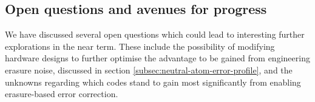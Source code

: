 \documentclass{article}
\begin{document}




    \subsection{Open questions and avenues for progress}

    We have discussed several open questions which could lead to interesting further explorations in the near term. These include the possibility of modifying hardware designs to further optimise the advantage to be gained from engineering erasure noise, discussed in section \ref{subsec:neutral-atom-error-profile}, and the unknowns regarding which codes stand to gain most significantly from enabling erasure-based error correction.\\
\end{document}
